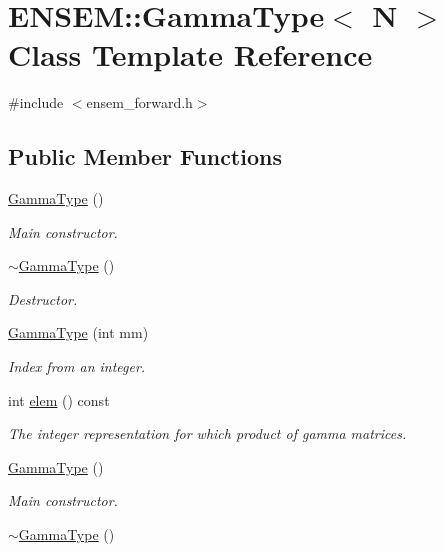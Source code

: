 \hypertarget{classENSEM_1_1GammaType}{}\section{E\+N\+S\+EM\+:\+:Gamma\+Type$<$ N $>$ Class Template Reference}
\label{classENSEM_1_1GammaType}


{\ttfamily \#include $<$ensem\+\_\+forward.\+h$>$}

\subsection*{Public Member Functions}
\begin{DoxyCompactItemize}
\item 
\mbox{\hyperlink{classENSEM_1_1GammaType_a40badc5d1ed98704d66277e171adb121}{Gamma\+Type}} ()
\begin{DoxyCompactList}\small\item\em Main constructor. \end{DoxyCompactList}\item 
\mbox{\hyperlink{classENSEM_1_1GammaType_a2cc80e9a9f044b1b9b344f3419718a5e}{$\sim$\+Gamma\+Type}} ()
\begin{DoxyCompactList}\small\item\em Destructor. \end{DoxyCompactList}\item 
\mbox{\hyperlink{classENSEM_1_1GammaType_ab93a83aeee6b442968d78f30cb6b4a65}{Gamma\+Type}} (int mm)
\begin{DoxyCompactList}\small\item\em Index from an integer. \end{DoxyCompactList}\item 
int \mbox{\hyperlink{classENSEM_1_1GammaType_a2813c3878cd269c7a37c588875682705}{elem}} () const
\begin{DoxyCompactList}\small\item\em The integer representation for which product of gamma matrices. \end{DoxyCompactList}\item 
\mbox{\hyperlink{classENSEM_1_1GammaType_a40badc5d1ed98704d66277e171adb121}{Gamma\+Type}} ()
\begin{DoxyCompactList}\small\item\em Main constructor. \end{DoxyCompactList}\item 
\mbox{\hyperlink{classENSEM_1_1GammaType_a2cc80e9a9f044b1b9b344f3419718a5e}{$\sim$\+Gamma\+Type}} ()

\end{DoxyCompactItemize}
